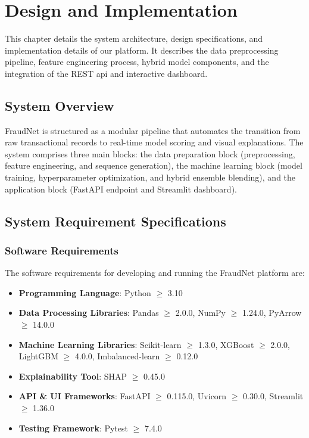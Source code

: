 \chapter{Design and Implementation}

This chapter details the system architecture, design specifications, and implementation details of our platform. It describes the data preprocessing pipeline, feature engineering process, hybrid model components, and the integration of the REST \gls{api} and interactive dashboard.

\section{System Overview}

FraudNet is structured as a modular pipeline that automates the transition from raw transactional records to real-time model scoring and visual explanations. The system comprises three main blocks: the data preparation block (preprocessing, feature engineering, and sequence generation), the machine learning block (model training, hyperparameter optimization, and hybrid ensemble blending), and the application block (FastAPI endpoint and Streamlit dashboard).

\section{System Requirement Specifications}

\subsection{Software Requirements}
The software requirements for developing and running the FraudNet platform are:
\begin{itemize}
    \item \textbf{Programming Language}: Python $\ge$ 3.10
    \item \textbf{Data Processing Libraries}: Pandas $\ge$ 2.0.0, NumPy $\ge$ 1.24.0, PyArrow $\ge$ 14.0.0
    \item \textbf{Machine Learning Libraries}: Scikit-learn $\ge$ 1.3.0, XGBoost $\ge$ 2.0.0, LightGBM $\ge$ 4.0.0, Imbalanced-learn $\ge$ 0.12.0
    \item \textbf{Explainability Tool}: SHAP $\ge$ 0.45.0
    \item \textbf{API \& UI Frameworks}: FastAPI $\ge$ 0.115.0, Uvicorn $\ge$ 0.30.0, Streamlit $\ge$ 1.36.0
    \item \textbf{Testing Framework}: Pytest $\ge$ 7.4.0
\end{itemize}

